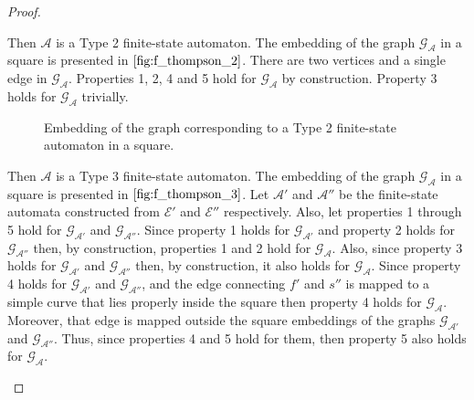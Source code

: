 \begin{proof}
  \begin{case}[$\mathcal{E} = \sigma$ where $\sigma \in \Sigma_\epsilon$]
    Then $\mathcal{A}$ is a Type 2 finite-state automaton. The embedding of the
    graph $\mathcal{G}_{\mathcal{A}}$ in a square is presented in
    $\Cref{fig:f_thompson_2}$. There are two vertices and a single edge in
    $\mathcal{G}_{\mathcal{A}}$. Properties 1, 2, 4 and 5 hold for
    $\mathcal{G}_{\mathcal{A}}$ by construction. Property 3 holds for
    $\mathcal{G}_{\mathcal{A}}$ trivially.

    \begin{figure}[!h]
      \centering
      \caption{Embedding of the graph corresponding to a Type 2 finite-state
      automaton in a square.}
      \label{fig:f_thompson_2}
    \end{figure}
  \end{case}

  \begin{case}[$\mathcal{E} = \mathcal{E}'.\mathcal{E}''$ where $\mathcal{E}'$ and
    $\mathcal{E}''$ are regular expressions]
    Then $\mathcal{A}$ is a Type 3 finite-state automaton. The embedding of the graph
    $\mathcal{G}_{\mathcal{A}}$ in a square is presented in
    $\Cref{fig:f_thompson_3}$. Let $\mathcal{A}'$ and $\mathcal{A}''$ be the
    finite-state automata constructed from $\mathcal{E}'$ and $\mathcal{E}''$
    respectively. Also, let properties 1 through 5 hold for
    $\mathcal{G}_\mathcal{A'}$ and $\mathcal{G}_\mathcal{A''}$. Since property 1
    holds for $\mathcal{G}_\mathcal{A'}$ and property 2 holds for
    $\mathcal{G}_\mathcal{A''}$ then, by construction, properties 1 and
    2 hold for $\mathcal{G}_\mathcal{A}$. Also, since property 3 holds
    for $\mathcal{G}_\mathcal{A'}$ and $\mathcal{G}_\mathcal{A''}$
    then, by construction, it also holds for $\mathcal{G}_\mathcal{A}$.
    Since property 4 holds for $\mathcal{G}_\mathcal{A'}$ and
    $\mathcal{G}_\mathcal{A''}$, and the edge connecting $f'$ and $s''$
    is mapped to a simple curve that lies properly inside the square
    then property 4 holds for $\mathcal{G}_\mathcal{A}$. Moreover, that
    edge is mapped outside the square embeddings of the graphs
    $\mathcal{G}_\mathcal{A'}$ and $\mathcal{G}_\mathcal{A''}$. Thus,
    since properties 4 and 5 hold for them, then property 5 also holds for
    $\mathcal{G}_\mathcal{A}$.


\end{case}
\end{proof}
